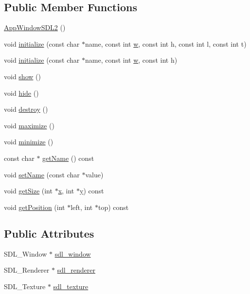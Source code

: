 \subsection*{Public Member Functions}
\begin{DoxyCompactItemize}
\item 
\hyperlink{classAppWindowSDL2_a914c1282d991c93fcc5130fb67cfc602}{App\-Window\-S\-D\-L2} ()
\item 
void \hyperlink{classAppWindowSDL2_abcebe12c7251e837fff10a445ad08845}{initialize} (const char $\ast$name, const int \hyperlink{VectF4_8h_a56eca241e2896b9f57a79589e76fd24b}{w}, const int h, const int l, const int t)
\item 
void \hyperlink{classAppWindowSDL2_a1adbcd6281ca59a7e1dcdb206eb55028}{initialize} (const char $\ast$name, const int \hyperlink{VectF4_8h_a56eca241e2896b9f57a79589e76fd24b}{w}, const int h)
\item 
void \hyperlink{classAppWindowSDL2_a87c1dc4ef0a137fd0f2080c568c74cc2}{show} ()
\item 
void \hyperlink{classAppWindowSDL2_a51f4c0c28cc3cc02885312d83f9e40bd}{hide} ()
\item 
void \hyperlink{classAppWindowSDL2_a93166685dfc7a8abd80d6bc9b70a9740}{destroy} ()
\item 
void \hyperlink{classAppWindowSDL2_ae3a42bcd6c5cf2d452838085e5e0eecb}{maximize} ()
\item 
void \hyperlink{classAppWindowSDL2_a6c0b650d1b15140d7f163956d0689327}{minimize} ()
\item 
const char $\ast$ \hyperlink{classAppWindowSDL2_a64e9c06dfdbf16734f35254d0b0f502b}{get\-Name} () const 
\item 
void \hyperlink{classAppWindowSDL2_af7511fea50b7b41fbc03d25a6f160bac}{set\-Name} (const char $\ast$value)
\item 
void \hyperlink{classAppWindowSDL2_aa847e6e3c2049fa2fddbb64ba74f22e8}{get\-Size} (int $\ast$\hyperlink{VectF4_8h_ad0da36b2558901e21e7a30f6c227a45e}{x}, int $\ast$\hyperlink{VectF4_8h_aa4f0d3eebc3c443f9be81bf48561a217}{y}) const 
\item 
void \hyperlink{classAppWindowSDL2_a3b8b8643947afabd7f2b66b0d12a34e1}{get\-Position} (int $\ast$left, int $\ast$top) const 
\end{DoxyCompactItemize}
\subsection*{Public Attributes}
\begin{DoxyCompactItemize}
\item 
S\-D\-L\-\_\-\-Window $\ast$ \hyperlink{classAppWindowSDL2_a47f7d1f174e4b7b96d99a96bd5916a3d}{sdl\-\_\-window}
\item 
S\-D\-L\-\_\-\-Renderer $\ast$ \hyperlink{classAppWindowSDL2_a539103b261c406ef7d4ef978b79fa56c}{sdl\-\_\-renderer}
\item 
S\-D\-L\-\_\-\-Texture $\ast$ \hyperlink{classAppWindowSDL2_af7cc56a6049e4b78386e3e7e5e047e9e}{sdl\-\_\-texture}
\end{DoxyCompactItemize}


